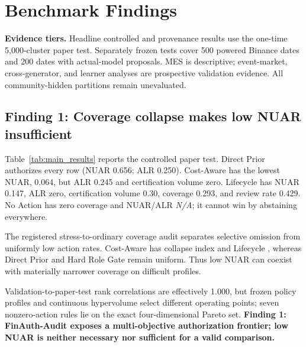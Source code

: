 \section{Benchmark Findings}

\textbf{Evidence tiers.} Headline controlled and provenance results use the one-time 5,000-cluster paper test. Separately frozen tests cover 500 powered Binance dates and 200 dates with \RealAgentProposalRows{} actual-model proposals. MES is descriptive; event-market, cross-generator, and learner analyses are prospective validation evidence. All community-hidden partitions remain unevaluated.

\subsection{Finding 1: Coverage collapse makes low NUAR insufficient}
Table~\ref{tab:main_results} reports the controlled paper test. Direct Prior authorizes every row (NUAR 0.656; ALR 0.250). Cost-Aware has the lowest NUAR, 0.064, but ALR 0.245 and certification volume zero. Lifecycle has NUAR 0.147, ALR zero, certification volume 0.30, coverage 0.293, and review rate 0.429. No Action has zero coverage and NUAR/ALR \textit{N/A}; it cannot win by abstaining everywhere.

The registered stress-to-ordinary coverage audit separates selective omission from uniformly low action rates. Cost-Aware has collapse index \CostAwareCollapseIndex{} and Lifecycle \LifecycleCollapseIndex{}, whereas Direct Prior and Hard Role Gate remain uniform. Thus low NUAR can coexist with materially narrower coverage on difficult profiles.

\begin{table}[t]
  \caption{\textbf{Paper-test operating points and validation conservative hypervolume reject a single-winner interpretation.} CAU is cumulative authorized utility; MOC is missed opportunity cost; Val. HV is a pre-frozen validation sensitivity. Full certification grids and the Pareto set appear in the supplement. \textit{N/A} denotes structural zero authorization.}
  \label{tab:main_results}
  \centering
  \benchmarktableformat
  
\end{table}

Validation-to-paper-test rank correlations are effectively 1.000, but frozen policy profiles and continuous hypervolume select different operating points; seven nonzero-action rules lie on the exact four-dimensional Pareto set. \textbf{Finding 1: FinAuth-Audit exposes a multi-objective authorization frontier; low NUAR is neither necessary nor sufficient for a valid comparison.}


